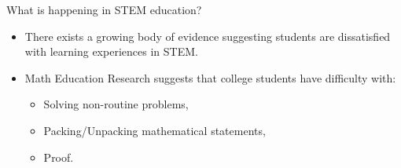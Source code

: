 \documentclass[10pt]{beamer}
\begin{document}
\begin{frame}

\begin{block}{What is happening in STEM education?}
\begin{itemize}
\item<2-> There exists a growing body of evidence suggesting students are dissatisfied with learning experiences in STEM.
\item<3-> Math Education Research suggests that college students have difficulty with:
    \begin{itemize}\normalsize
    \item<4-> Solving non-routine problems,
    \item<4-> Packing/Unpacking mathematical statements,
    \item<4-> Proof.
    \end{itemize}
\end{itemize}

\vspace{1em}


\end{block}

\end{frame}

\end{document}
